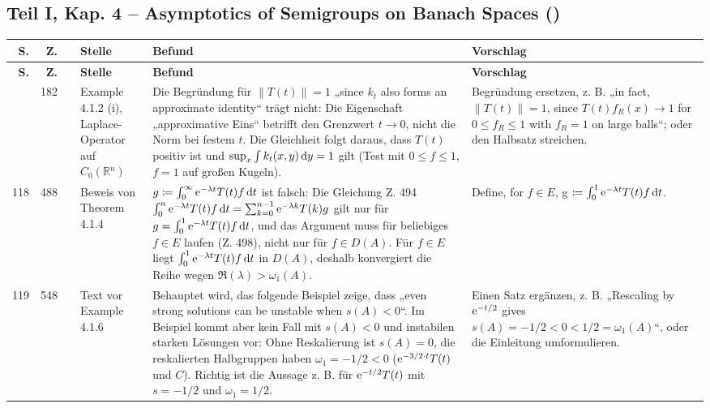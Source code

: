 \documentclass[10pt]{article}
\begin{document}
\subsection*{Teil I, Kap. 4 – Asymptotics of Semigroups on Banach Spaces ()}
\begin{longtable}{@{}rrc>{\RaggedRight\arraybackslash}p{3.0cm}>{\RaggedRight\arraybackslash}p{11.4cm}>{\RaggedRight\arraybackslash}p{7.4cm}@{}}
\toprule
\textbf{S.} & \textbf{Z.} & \textbf{} & \textbf{Stelle} & \textbf{Befund} & \textbf{Vorschlag} \\
\midrule
\endfirsthead
\toprule
\textbf{S.} & \textbf{Z.} & \textbf{} & \textbf{Stelle} & \textbf{Befund} & \textbf{Vorschlag} \\
\midrule
\endhead
\bottomrule
\endlastfoot
113 & 182 & \sichC{} & Example 4.1.2 (i), Laplace-Operator auf $C_0(\ensuremath{\mathbb{R}}\ensuremath{^{n}})$ & Die Begründung für $\|T(t)\| = 1$ „since $k_t$ also forms an approximate identity“ trägt nicht: Die Eigenschaft „approximative Eins“ betrifft den Grenzwert $t \to 0$, nicht die Norm bei festem $t$. Die Gleichheit folgt daraus, dass $T(t)$ positiv ist und $\sup_x \int k_t(x,y)\mathop{}\!\mathrm{d}{y} = 1$ gilt (Test mit $0 \le f \le 1$, $f = 1$ auf großen Kugeln). & Begründung ersetzen, z. B. „in fact, $\|T(t)\| = 1$, since $T(t)f_R(x) \to 1$ for $0 \leq f_R \leq 1$ with $f_R = 1$ on large balls“; oder den Halbsatz streichen. \\[2pt]
118 & 488 & \sichA{} & Beweis von Theorem 4.1.4 & $g \coloneq \int_0^\infty \mathrm{e}^{-\lambda t} T(t) f \mathop{}\!\mathrm{d}{t}$ ist falsch: Die Gleichung Z. 494 $\int_0^n \mathrm{e}^{-\lambda t} T(t) f \mathop{}\!\mathrm{d}{t} = \sum_{k=0}^{n-1} \mathrm{e}^{-\lambda k} T(k) g$ gilt nur für $g = \int_0^1 \mathrm{e}^{-\lambda t} T(t) f \mathop{}\!\mathrm{d}{t}$, und das Argument muss für beliebiges $f \in E$ laufen (Z. 498), nicht nur für $f \in D(A)$. Für $f \in E$ liegt $\int_0^1 \mathrm{e}^{-\lambda t} T(t)f \mathop{}\!\mathrm{d}{t}$ in $D(A)$, deshalb konvergiert die Reihe wegen $\Re(\lambda) > \omega_1(A)$. & {Define, for $f \in E$, g $\coloneq \int_0^1 \mathrm{e}^{-\lambda t} T(t) f \mathop{}\!\mathrm{d}{t}$.} \\[2pt]
119 & 548 & \sichC{} & Text vor Example 4.1.6 & Behauptet wird, das folgende Beispiel zeige, dass „even strong solutions can be unstable when $s(A) < 0$“. Im Beispiel kommt aber kein Fall mit $s(A) < 0$ und instabilen starken Lösungen vor: Ohne Reskalierung ist $s(A) = 0$, die reskalierten Halbgruppen haben $\omega_1 = -1/2 < 0$ ($\mathrm{e}^{-3/2 \cdot t}T(t)$ und $C$). Richtig ist die Aussage z. B. für $\mathrm{e}^{-t/2}T(t)$ mit $s = -1/2$ und $\omega_1 = 1/2$. & Einen Satz ergänzen, z. B. „Rescaling by $\mathrm{e}^{-t/2}$ gives $s(A) = -1/2 < 0 < 1/2 = \omega_1(A)$“, oder die Einleitung umformulieren. \\[2pt]

\end{longtable}
\end{document}
